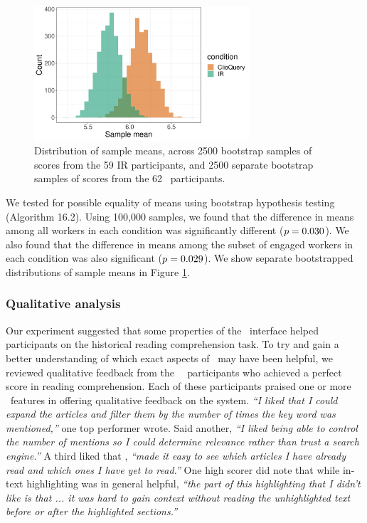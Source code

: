 \begin{figure}[h]
    \centering
    \includegraphics[width=8cm]{figures/bootstrap_means.pdf}
    \caption{Distribution of sample means, across 2500 bootstrap samples of scores from the 59 IR participants, and 2500 separate bootstrap samples of scores from the 62 \ours~participants.}\label{f:samples}
\end{figure}

We tested for possible equality of means using bootstrap hypothesis testing \cite{Efron} (Algorithm 16.2).
Using 100,000 samples, we found that the difference in means among all workers in each condition was significantly different ($p=0.030$). 
We also found that the difference in means among the subset of engaged workers in each condition was also significant ($p=0.029$). %
We show separate bootstrapped distributions of sample means in Figure \ref{f:samples}.




\subsubsection{Qualitative analysis}\label{s:turk_qual}
Our experiment suggested that some properties of the \ours~interface helped participants on the historical reading comprehension task.
To try and gain a better understanding of which exact aspects of \ours~may have been helpful, we reviewed qualitative feedback from the \cqNperfectscore~\ours~participants who achieved a perfect score in reading comprehension.
Each of these participants praised one or more \ours~features in offering qualitative feedback on the system.
\textit{``I liked that I could expand the articles and filter them by the number of times the key word was mentioned,''} one top performer wrote. Said another, \textit{``I liked being able to control the number of mentions so I could determine relevance rather than trust a search engine.''} A third liked that \ours, \textit{``made it easy to see which articles I have already read and which ones I have yet to read.''} One high scorer did note that while in-text highlighting was in general helpful, \textit{``the part of this highlighting that I didn't like is that ... it was hard to gain context without reading the unhighlighted text before or after the highlighted sections.''}

